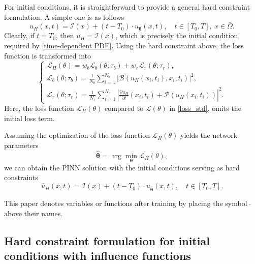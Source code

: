 \documentclass[preprint]{elsarticle}
\numberwithin{table}{section}
\numberwithin{equation}{section}
\numberwithin{figure}{section}
\begin{document}
\begin{CJK}{UTF8}{gbsn}
For initial conditions, it is straightforward to provide a general hard constraint formulation. A  simple one is as follows
\begin{equation}\label{eq:HC_YYZ1}
     u_H(x,t) = \mathcal{I}(x) + (t-T_0)\cdot u_{\boldsymbol{\theta}}(x,t), \quad t\in [T_0,T],\ x\in \bar\Omega.
\end{equation} 
Clearly, if $t=T_0$, then $u_H = \mathcal{I}(x)$, which is precisely the initial condition required by \eqref{time-dependent PDE}. Using the hard constraint above, the loss function is transformed into  
\begin{equation}\label{loss_HDTime}
\begin{cases}
\mathcal{L}_H(\theta)=w_b\mathcal{L}_b(\theta;\tau_b)+w_r\mathcal{L}_r(\theta;\tau_r),\\
\mathcal{L}_b(\theta;\tau_{b})= \frac{1}{N_b} \sum_{i=1}^{N_b}\left|\mathcal{B}(  u_H(x_i,t_i),x_i,t_i)\right|^2 , \\
\mathcal{L}_r(\theta;\tau_{r})=\frac{1}{N_r} \sum_{i=1}^{N_r}\left| \frac{\displaystyle{\partial u_H}}{\displaystyle{\partial t}}(x_i,t_i) +  \mathcal{P}(u_H(x_i,t_i)) \right|^2.
\end{cases}
\end{equation}
Here, the loss function $\mathcal{L}_H(\theta)$ compared to $\mathcal{L}(\theta)$ in  \eqref{loss_std}, omits the initial loss term.
  
Assuming the optimization of the loss function $\mathcal{L}_H(\theta)$ yields the network parameters 
\begin{equation}
 \hat{{\boldsymbol{\theta}}} = \arg\min_{{\boldsymbol{\theta}}} \mathcal{L}_H(\theta), 
\end{equation}
we can obtain the PINN solution  with the initial conditions serving as hard constraints
 \begin{equation}\label{eq:HC_PINN}
     \hat u_H(x,t) = \mathcal{I}(x) + (t-T_0)\cdot u_{\hat{\boldsymbol{\theta}}}(x,t), \quad t\in [T_0,T].
\end{equation}
 

  This paper denotes variables or functions after training by placing the symbol  $\ \hat{}$ 
  above their names.    


  \subsection{Hard constraint formulation for initial conditions with influence functions}



\end{CJK}
\end{document}
